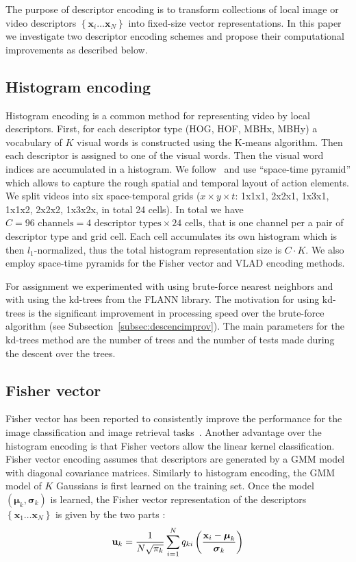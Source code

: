 \documentclass[10pt,twocolumn,letterpaper]{article}
\begin{document}
The purpose of descriptor encoding is to transform collections of local image or video descriptors $\left\{\textbf{x}_i\dots\textbf{x}_N\right\}$ into fixed-size vector representations.
In this paper we investigate two descriptor encoding schemes and propose their computational improvements as described below.

\subsection{Histogram encoding}
\label{subsec:histenc}
Histogram encoding is a common method for representing video by local descriptors. First, for each descriptor type (HOG, HOF, MBHx, MBHy) a vocabulary of $K$ visual words is constructed using the K-means algorithm. Then each descriptor is assigned to one of the visual words. Then the visual word indices are accumulated in a histogram. We follow~\cite{Laptev08} and use ``space-time pyramid'' which allows to capture the rough spatial and temporal layout of action elements. We split videos into six space-temporal grids ($x\times y \times t$: 1x1x1, 2x2x1, 1x3x1, 1x1x2, 2x2x2, 1x3x2x, in total 24 cells). In total we have $C=96\text{ channels} = 4 \text{ descriptor types}\times 24\text{ cells}$, that is one channel per a pair of descriptor type and grid cell. Each cell accumulates its own histogram which is then $l_1$-normalized, thus the total histogram representation size is $C\cdot K$. We also employ space-time pyramids for the Fisher vector and VLAD encoding methods.

For assignment we experimented with using brute-force nearest neighbors and with using the kd-trees from the FLANN library. The motivation for using kd-trees is the significant improvement in processing speed over the brute-force algorithm (see Subsection~\ref{subsec:descencimprov}). The main parameters for the kd-trees method are the number of trees and the number of tests  made during the descent over the trees. 

\subsection{Fisher vector}
Fisher vector has been reported to consistently improve the performance for the image classification and image retrieval tasks~\cite{Jegou12}. Another advantage over the histogram encoding is that Fisher vectors allow the linear kernel classification. Fisher vector encoding assumes that descriptors are generated by a GMM model with diagonal covariance matrices. Similarly to histogram encoding, the GMM model of $K$ Gaussians is first learned on the training set. 
Once the model $\left(\boldsymbol\mu_k, \boldsymbol\sigma_k\right)$ is learned, the Fisher vector representation of the descriptors $\left\{\textbf{x}_1\dots \textbf{x}_N\right\}$ is given by the two parts \cite{Perronnin10}:
$${\textbf u}_k = \frac{1}{N\sqrt{\pi_k}}\sum_{i=1}^{N}q_{ki}\left(\frac{\textbf{x}_i-\boldsymbol\mu_k}{\boldsymbol\sigma_k}\right)$$
\end{document}
